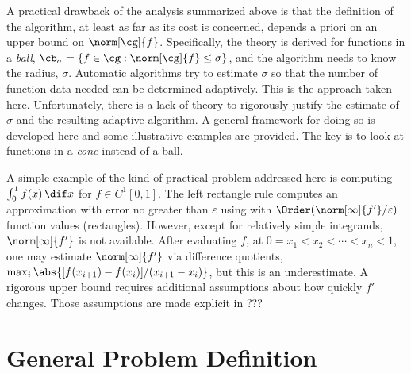 \documentclass[final]{elsarticle}
\theoremstyle{definition}
\theoremstyle{remark}
\begin{document}
A practical drawback of the analysis summarized above is that the definition of the algorithm, at least as far as its cost is concerned, depends a priori on an upper bound on $\norm[\cg]{f}$. Specifically, the theory is derived for functions in a \emph{ball}, $\cb_\sigma=\{ f \in \cg : \norm[\cg]{f} \le \sigma\}$, and the algorithm needs to know the radius, $\sigma$. Automatic algorithms try to estimate $\sigma$ so that the number of function data needed can be determined adaptively.  This is the approach taken here.  Unfortunately, there is a lack of theory to rigorously justify the estimate of $\sigma$ and the resulting adaptive algorithm.  A general framework for doing so is developed here and some illustrative examples are provided. The key is to look at functions in a \emph{cone} instead of a ball.

A simple example of the kind of practical problem addressed here is computing $\int_0^1 f(x) \, \dif x$ for $f \in C^1[0,1]$.  The left rectangle rule computes an approximation with error no greater than $\varepsilon$ using with $\Order(\norm[\infty]{f'}/\varepsilon)$ function values (rectangles).  However, except for relatively simple integrands, $\norm[\infty]{f'}$ is not available.  After evaluating $f$, at $0 = x_1 < x_2 < \cdots < x_n < 1$, one may estimate  $\norm[\infty]{f'}$ via difference quotients, $\max_i\abs{[f(x_{i+1})-f(x_i)]/(x_{i+1}-x_i)}$, but this is an underestimate.  A rigorous upper bound requires additional assumptions about how quickly $f'$ changes.  Those assumptions are made explicit in ???


\section{General Problem Definition}
\end{document}
